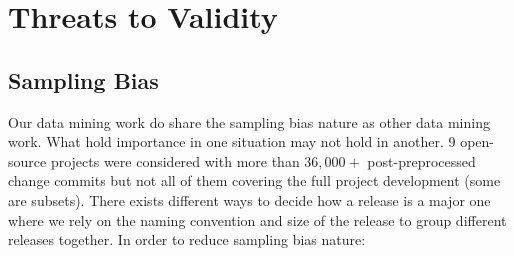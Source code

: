 \documentclass[sigconf,review, anonymous]{acmart}
\newenvironment{RQ}[1]%
{\noindent\begin{minipage}[c]{\linewidth}%
\begin{bclogo}[couleur=gray!25,%
                arrondi=0.1,%
                logo=\bctrombone,%
                ombre=true]{~#1}}%
{\end{bclogo}\end{minipage}\vspace{2mm}}
\begin{document}









\section{Threats to Validity }

\subsection{Sampling Bias}

Our data mining work do share the sampling bias nature as other data mining work. What hold importance in one situation may not hold in another. 9 open-source projects were considered with more than $36,000+$ post-preprocessed change commits but not all of them covering the full project development (some are subsets). There exists different ways to decide how a release is a major one where we rely on the naming convention and size of the release to group different releases together. In order to reduce sampling bias nature:
\end{document}
